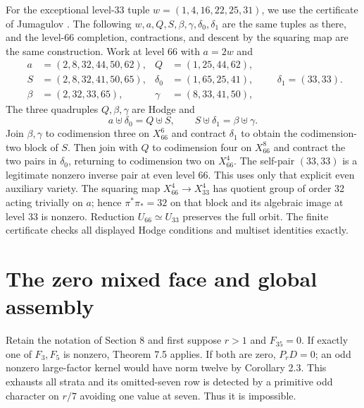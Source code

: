 \documentclass[11pt]{amsart}
\numberwithin{theorem}{section}
\theoremstyle{remark}
\numberwithin{equation}{section}
\begin{document}
For the exceptional level-33 tuple
\(w=(1,4,16,22,25,31)\), we use the certificate of Jumagulov
\cite[Theorem 1.4, p.~5]{jumagulov2026}. The following \(w,a,Q,S,\beta,\gamma,\delta_0,\delta_1\)
are the same tuples as there, and the level-66 completion, contractions,
and descent by the squaring map are the same construction. Work at level
66 with \(a=2w\) and
\[
\begin{aligned}
a&=(2,8,32,44,50,62),& Q&=(1,25,44,62),\\
S&=(2,8,32,41,50,65),&\delta_0&=(1,65,25,41),\\
\beta&=(2,32,33,65),&\gamma&=(8,33,41,50),
\end{aligned}
\qquad\delta_1=(33,33).
\]
The three quadruples \(Q,\beta,\gamma\) are Hodge and
\[
a\uplus\delta_0=Q\uplus S,\qquad
S\uplus\delta_1=\beta\uplus\gamma.
\]
Join \(\beta,\gamma\) to codimension three on \(X_{66}^6\) and
contract \(\delta_1\) to obtain the codimension-two block of \(S\).
Then join with \(Q\) to codimension four on \(X_{66}^8\) and contract
the two pairs in \(\delta_0\), returning to codimension two on
\(X_{66}^4\). The self-pair \((33,33)\) is a legitimate nonzero
inverse pair at even level 66. This uses only that explicit even
auxiliary variety. The squaring map \(X_{66}^4\to X_{33}^4\) has
quotient group of order 32 acting trivially on \(a\); hence
\(\pi^*\pi_*=32\) on that block and its algebraic image at level 33
is nonzero. Reduction \(U_{66}\simeq U_{33}\) preserves the full orbit.
The finite certificate checks all displayed Hodge conditions and multiset
identities exactly.

\section{The zero mixed face and global assembly}\label{sec:10}

Retain the notation of Section 8 and first suppose \(r>1\) and
\(F_{35}=0\). If exactly one of \(F_3,F_5\) is nonzero, Theorem 7.5
applies. If both are zero, \(P_rD=0\); an odd nonzero large-factor
kernel would have norm twelve by Corollary 2.3. This exhausts all strata
and its omitted-seven row is detected by a primitive odd character on
\(r/7\) avoiding one value at seven. Thus it is impossible.
\end{document}
